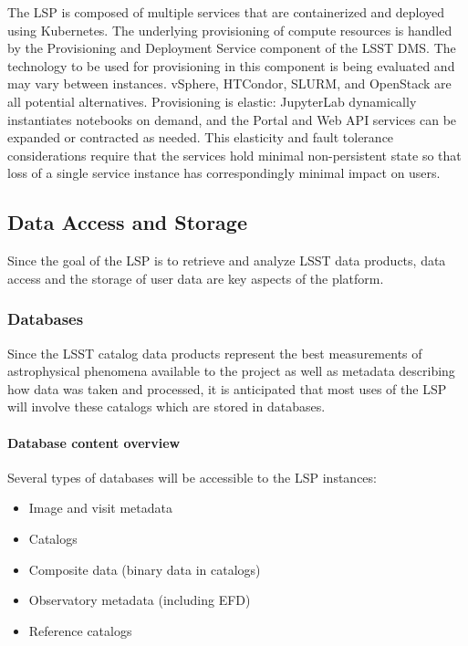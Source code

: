 The LSP is composed of multiple services that are containerized and deployed
using Kubernetes.  The underlying provisioning of compute resources is handled
by the Provisioning and Deployment Service component of the LSST DMS.  The
technology to be used for provisioning in this component is being evaluated and
may vary between instances.  vSphere, HTCondor, SLURM, and OpenStack are all
potential alternatives.  Provisioning is elastic: JupyterLab dynamically
instantiates notebooks on demand, and the Portal and Web API services can be
expanded or contracted as needed.  This elasticity and fault tolerance
considerations require that the services hold minimal non-persistent state so
that loss of a single service instance has correspondingly minimal impact on
users.

\subsection{Data Access and Storage}\label{data-access-and-storage}

Since the goal of the LSP is to retrieve and analyze LSST data products,
data access and the storage of user data are key aspects of the platform.

\subsubsection{Databases}\label{databases}

Since the LSST catalog data products represent the best measurements of
astrophysical phenomena available to the project as well as metadata
describing how data was taken and processed, it is anticipated that
most uses of the LSP will involve these catalogs which are stored in
databases.

\paragraph{Database content overview}\label{database-content-overview}

Several types of databases will be accessible to the LSP instances:
\begin{itemize}
\item Image and visit metadata
\item Catalogs
\item Composite data (binary data in catalogs)
\item Observatory metadata (including EFD)
\item Reference catalogs
\end{itemize}

